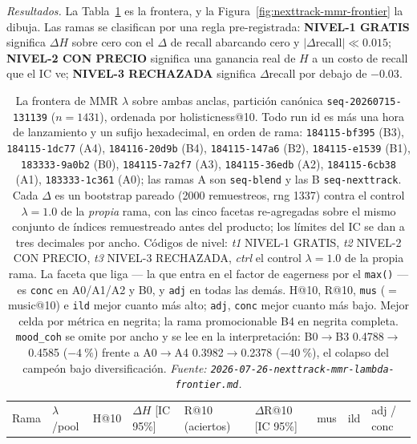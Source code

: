 \documentclass[11pt]{article}
\newcommand{\runid}[1]{\texttt{\small\seqsplit{#1}}}
\newcommand{\dsid}[1]{\texttt{\small #1}}
\begin{document}
\emph{Resultados.} La Tabla~\ref{tab:mmr-arms} es la frontera, y la
Figura~\ref{fig:nexttrack-mmr-frontier} la dibuja. Las ramas se clasifican por una
regla pre-registrada: \textbf{NIVEL-1 GRATIS} significa $\Delta H$ sobre cero con
el $\Delta$ de recall abarcando cero y $|\Delta\text{recall}| \ll \num{0.015}$;
\textbf{NIVEL-2 CON PRECIO} significa una ganancia real de $H$ a un costo de recall
que el IC ve; \textbf{NIVEL-3 RECHAZADA} significa $\Delta$recall por debajo de
$-\num{0.03}$.

\begin{table}[ht]
  \centering
  \caption{La frontera de MMR $\lambda$ sobre ambas anclas, partición canónica
  \dsid{seq-20260715-131139} ($n=\num{1431}$), ordenada por holisticness@10. Todo
  run id es \protect\runid{run-20260726-} más una hora de lanzamiento y un sufijo
  hexadecimal, en orden de rama: \texttt{184115-bf395} (B3),
  \texttt{184115-1dc77} (A4), \texttt{184116-20d9b} (B4),
  \texttt{184115-147a6} (B2), \texttt{184115-e1539} (B1),
  \texttt{183333-9a0b2} (B0), \texttt{184115-7a2f7} (A3),
  \texttt{184115-36edb} (A2), \texttt{184115-6cb38} (A1),
  \texttt{183333-1c361} (A0); las ramas A son \texttt{seq-blend} y las B
  \texttt{seq-nexttrack}. Cada $\Delta$ es un bootstrap pareado (\num{2000}
  remuestreos, rng \num{1337}) contra el control $\lambda=\num{1.0}$ de la
  \emph{propia} rama, con las cinco facetas re-agregadas sobre el mismo conjunto
  de índices remuestreado antes del producto; los límites del IC se dan a tres
  decimales por ancho. Códigos de nivel: \emph{t1} NIVEL-1 GRATIS, \emph{t2}
  NIVEL-2 CON PRECIO, \emph{t3} NIVEL-3 RECHAZADA, \emph{ctrl} el control
  $\lambda=\num{1.0}$ de la propia rama. La faceta que liga --- la que entra en el
  factor de eagerness por el \texttt{max()} --- es \texttt{conc} en A0/A1/A2 y B0, y
  \texttt{adj} en todas las demás. H@10, R@10, \texttt{mus} ($=$ music@10) e
  \texttt{ild} mejor cuanto más alto; \texttt{adj}, \texttt{conc} mejor cuanto más
  bajo. Mejor celda por métrica en negrita; la rama promocionable B4 en negrita
  completa. \texttt{mood\_coh} se omite por ancho y se lee en la interpretación:
  B0$\to$B3 \num{0.4788}$\to$\num{0.4585} ($-\SI{4}{\percent}$) frente a
  A0$\to$A4 \num{0.3982}$\to$\num{0.2378} ($-\SI{40}{\percent}$), el colapso del
  campeón bajo diversificación.
  \emph{Fuente: \texttt{2026-07-26-nexttrack-mmr-lambda-frontier.md}.}}
  \label{tab:mmr-arms}
  {\scriptsize\setlength{\tabcolsep}{1.9pt}\begin{tabular}{lllllllll}
    \toprule
    Rama & $\lambda$/pool & H@10 & $\Delta H$ [IC 95\%] & R@10 (aciertos) & $\Delta$R@10 [IC 95\%] & mus & ild & adj / conc \\

\end{tabular}}
\end{table}
\end{document}
